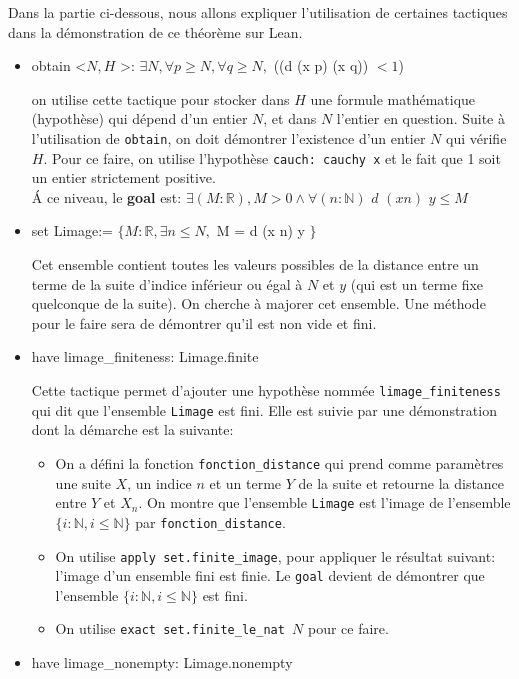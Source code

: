 Dans la partie ci-dessous, nous allons expliquer l'utilisation de certaines tactiques dans la démonstration de ce théorème sur Lean.\\
\begin{itemize}
    \item obtain \textless $N, H$ \textgreater : $\exists N, \forall p \geq N, \forall q \geq N,$ ((d (x p) (x q)) $< 1$)
    
    on utilise cette tactique pour stocker dans $H$ une formule mathématique (hypothèse) qui dépend d'un entier $N$, et dans $N$ l'entier en question. Suite à l'utilisation de \texttt{obtain}, on doit démontrer l'existence d'un entier $N$ qui vérifie $H$. Pour ce faire, on utilise l'hypothèse \texttt{cauch: cauchy x} et le fait que 1 soit un entier strictement positive.\\
    \'A ce niveau, le \textbf{goal} est: $\exists (M:\mathbb{R}), M > 0 \wedge \forall (n : \mathbb{N})$ $d$ $(x n)$ $y \leq M$
    \item set Limage:= $\big\{ M: \mathbb{R}, \exists n\leq N,$ M = d (x n) y $\big\}$
    
    
    Cet ensemble contient toutes les valeurs possibles de la distance entre un terme de la suite d'indice inférieur ou égal à $N$ et $y$ (qui est un terme fixe quelconque de la suite). On cherche à majorer cet ensemble. Une méthode pour le faire sera de démontrer qu'il est non vide et fini.
    \item have limage\_finiteness: Limage.finite
    
    
     Cette tactique permet d'ajouter une hypothèse nommée \texttt{limage\_finiteness} qui dit que l'ensemble \texttt{Limage} est fini. Elle est suivie par une démonstration dont la démarche est la suivante:
    \begin{itemize}
         \item On a défini la fonction \texttt{fonction\_distance} qui prend comme paramètres une suite $X$, un indice $n$ et un terme $Y$ de la suite et retourne la distance entre $Y$ et $X_n$. On montre que l'ensemble \texttt{Limage} est l'image de l'ensemble $\big\{i:\mathbb{N}, i\leq \mathbb{N}\big\}$ par \texttt{fonction\_distance}.
        \item On utilise \texttt{apply set.finite\_image}, pour appliquer le résultat suivant: l'image d'un ensemble fini est finie. Le \texttt{goal} devient de démontrer que l'ensemble $\big\{i:\mathbb{N}, i\leq \mathbb{N}\big\}$ est fini.
        \item On utilise \texttt{exact set.finite\_le\_nat $N$} pour ce faire.
    \end{itemize}
    \item have limage\_nonempty: Limage.nonempty 
    

\end{itemize}
